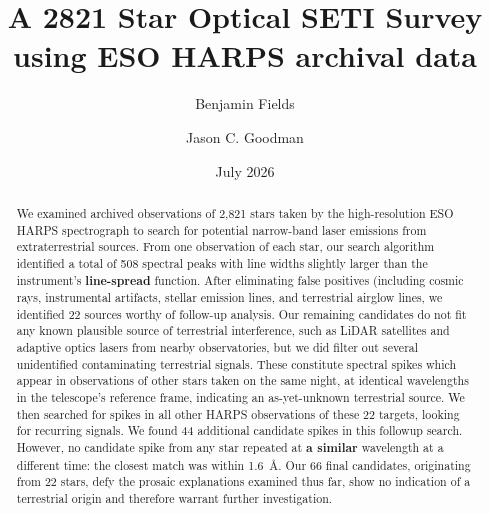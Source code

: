 \documentclass[linenumbers]{aastex701}
\providecommand{\DIFadd}[1]{{\bf #1}} %
\providecommand{\DIFaddbegin}{} %
\providecommand{\DIFaddend}{} %
\begin{document}
\title{A 2821 Star Optical SETI Survey using ESO HARPS archival data}
\author[0009-0008-7048-916X]{Benjamin Fields} %

\author[0000-0002-6755-2710]{Jason C. Goodman}

\date{July 2026}

\begin{abstract}
We examined archived observations of 2,821 stars taken by the high-resolution ESO HARPS spectrograph to search for potential narrow-band laser emissions from extraterrestrial sources. From one observation of each star, our search algorithm identified a total of 508 spectral peaks with line widths slightly larger than the instrument's  \DIFaddbegin \DIFadd{line-spread }\DIFaddend function.  After eliminating  false positives (including cosmic rays, instrumental artifacts, stellar emission lines, and terrestrial airglow lines, we identified 22 sources worthy of follow-up analysis.  Our remaining candidates do not fit any known plausible source of terrestrial interference, such as LiDAR satellites and adaptive optics lasers from nearby observatories, but we did filter out several unidentified contaminating terrestrial signals. These constitute spectral spikes which appear in observations of other stars taken on the same night, at identical wavelengths in the telescope's reference frame, indicating an as-yet-unknown terrestrial source.  We then searched for spikes in all other HARPS observations of these 22 targets, looking for recurring signals. We found 44 additional candidate spikes in this followup search.  However, no candidate spike from any star repeated at  \DIFaddbegin \DIFadd{a similar }\DIFaddend wavelength at a different time: the closest match was within 1.6~\AA. Our 66 final candidates, originating from 22 stars, defy the prosaic explanations examined thus far,  show no indication of a terrestrial origin and therefore warrant further investigation.
\end{abstract}
\end{document}
